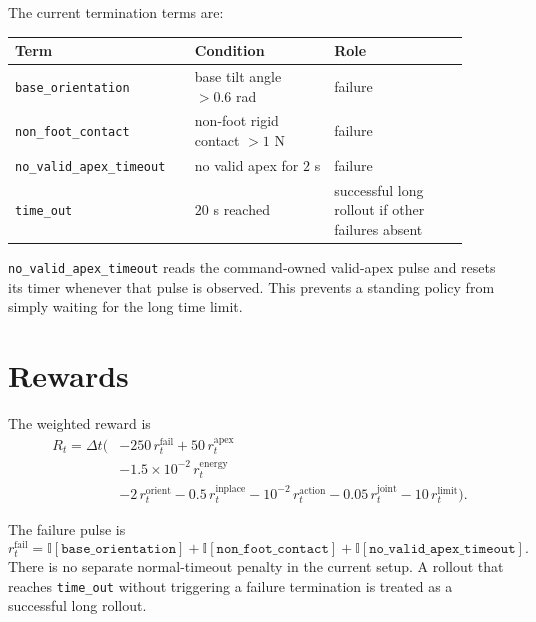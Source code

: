 \documentclass[11pt, a4paper]{article}
\begin{document}
The current termination terms are:
\begin{center}
\begin{tabular}{p{0.35\linewidth}p{0.28\linewidth}p{0.27\linewidth}}
\hline
Term & Condition & Role \\
\hline
\texttt{base\_orientation} & base tilt angle $>0.6$ rad & failure \\
\texttt{non\_foot\_contact} & non-foot rigid contact $>1$ N & failure \\
\texttt{no\_valid\_apex\_timeout} & no valid apex for $2$ s & failure \\
\texttt{time\_out} & $20$ s reached & successful long rollout if other failures absent \\
\hline
\end{tabular}
\end{center}

\texttt{no\_valid\_apex\_timeout} reads the command-owned valid-apex pulse and
resets its timer whenever that pulse is observed. This prevents a standing
policy from simply waiting for the long time limit.

\section{Rewards}

The weighted reward is
\begin{equation}
\begin{aligned}
    R_t = \Delta t \Big(
        &-250\,r^{\mathrm{fail}}_t
        +50\,r^{\mathrm{apex}}_t \\
        &-1.5\times10^{-2}\,r^{\mathrm{energy}}_t \\
        &-2\,r^{\mathrm{orient}}_t
        -0.5\,r^{\mathrm{inplace}}_t
        -10^{-2}\,r^{\mathrm{action}}_t
        -0.05\,r^{\mathrm{joint}}_t
        -10\,r^{\mathrm{limit}}_t
    \Big).
\end{aligned}
\end{equation}

The failure pulse is
\begin{equation}
    r^{\mathrm{fail}}_t =
    \mathbb{I}[\texttt{base\_orientation}]
    + \mathbb{I}[\texttt{non\_foot\_contact}]
    + \mathbb{I}[\texttt{no\_valid\_apex\_timeout}].
\end{equation}
There is no separate normal-timeout penalty in the current setup. A rollout
that reaches \texttt{time\_out} without triggering a failure termination is
treated as a successful long rollout.
\end{document}
